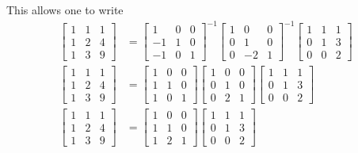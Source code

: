 This allows one to write
\begin{align*}
\left[ \begin{array}{ccc} 1 & 1 & 1 \\ 1 & 2 & 4 \\ 1 & 3 & 9 \end{array} \right]
& = \left[ \begin{array}{ccc} 1 & 0 & 0 \\ -1 & 1 & 0 \\ -1 & 0 & 1 \end{array} \right]^{-1}
\left[ \begin{array}{ccc} 1 & 0 & 0 \\ 0 & 1 & 0 \\ 0 & -2 & 1 \end{array} \right]^{-1}
\left[ \begin{array}{ccc} 1 & 1 & 1 \\ 0 & 1 & 3 \\ 0 & 0 & 2 \end{array} \right] \\
\left[ \begin{array}{ccc} 1 & 1 & 1 \\ 1 & 2 & 4 \\ 1 & 3 & 9 \end{array} \right]
& = \left[ \begin{array}{ccc} 1 & 0 & 0 \\ 1 & 1 & 0 \\ 1 & 0 & 1 \end{array} \right]
\left[ \begin{array}{ccc} 1 & 0 & 0 \\ 0 & 1 & 0 \\ 0 & 2 & 1 \end{array} \right]
\left[ \begin{array}{ccc} 1 & 1 & 1 \\ 0 & 1 & 3 \\ 0 & 0 & 2 \end{array} \right] \\
\left[ \begin{array}{ccc} 1 & 1 & 1 \\ 1 & 2 & 4 \\ 1 & 3 & 9 \end{array} \right]
& = \left[ \begin{array}{ccc} 1 & 0 & 0 \\ 1 & 1 & 0 \\ 1 & 2 & 1 \end{array} \right]
\left[ \begin{array}{ccc} 1 & 1 & 1 \\ 0 & 1 & 3 \\ 0 & 0 & 2 \end{array} \right] \\
\end{align*}

